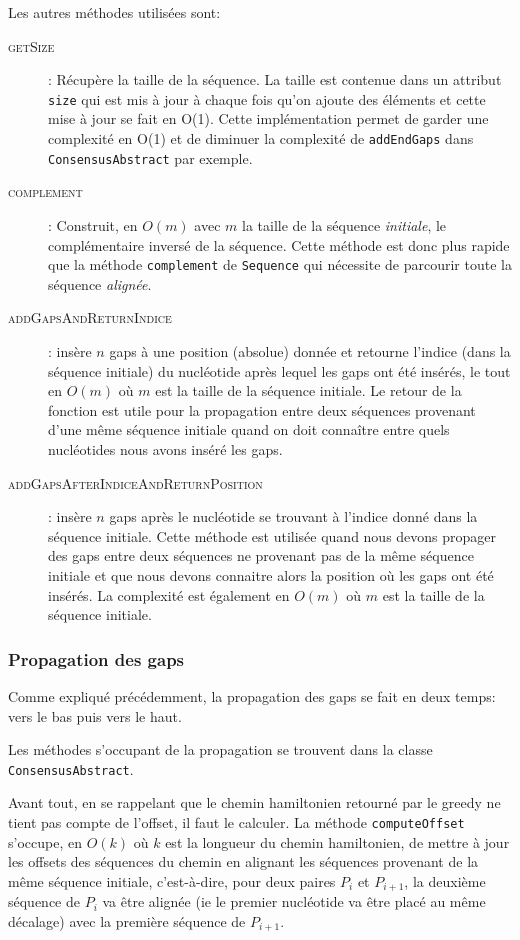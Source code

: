 Les autres méthodes utilisées sont:
\begin{description}
	\item[\textsc{getSize}]: Récupère la taille de la séquence. La taille est
		contenue dans un attribut \verb|size| qui est mis à jour à chaque fois
		qu'on ajoute des éléments et cette mise à jour se fait en O(1). Cette
		implémentation permet de garder une complexité en O(1) et de diminuer la
		complexité de \verb|addEndGaps| dans \verb|ConsensusAbstract| par
		exemple.
	\item[\textsc{complement}]: Construit, en $O(m)$ avec $m$ la taille de la
		séquence \textit{initiale}, le complémentaire inversé de la séquence.
		Cette méthode est donc plus rapide que la méthode \verb|complement| de
		\verb|Sequence| qui nécessite de parcourir toute la séquence
		\textit{alignée}.
	\item[\textsc{addGapsAndReturnIndice}]: insère $n$ gaps à
			une position (absolue) donnée et retourne l'indice (dans la séquence
			initiale) du nucléotide après lequel les gaps ont été insérés, le
			tout en $O(m)$ où $m$ est la taille de la séquence initiale. Le
			retour de la fonction est utile pour la propagation entre deux
			séquences provenant d'une même séquence initiale quand on doit
			connaître entre quels nucléotides nous avons inséré les gaps.
	\item[\textsc{addGapsAfterIndiceAndReturnPosition}]: insère $n$ gaps après
		le nucléotide se trouvant à l'indice donné dans la séquence initiale.
		Cette méthode est utilisée quand nous devons propager des gaps entre
		deux séquences ne provenant pas de la même séquence initiale et que nous
		devons connaitre alors la position où les gaps ont été insérés. La
		complexité est également en $O(m)$ où $m$ est la taille de la séquence
		initiale.
\end{description}

\subsubsection{Propagation des gaps}
\label{propagation_gaps}

Comme expliqué précédemment, la propagation des gaps se fait en deux temps: vers
le bas puis vers le haut.

Les méthodes s'occupant de la propagation se trouvent dans la classe
\verb|ConsensusAbstract|.

Avant tout, en se rappelant que le chemin hamiltonien retourné par le greedy ne
tient pas compte de l'offset, il faut le calculer. La méthode
\verb|computeOffset| s'occupe, en $O(k)$ où $k$ est la longueur du chemin
hamiltonien, de mettre à jour les offsets des séquences du chemin en alignant
les séquences provenant de la même séquence initiale, c'est-à-dire, pour deux
paires $P_{i}$ et $P_{i + 1}$, la deuxième séquence de $P_{i}$ va être alignée
(ie le premier nucléotide va être placé au même décalage) avec la première
séquence de $P_{i + 1}$.

